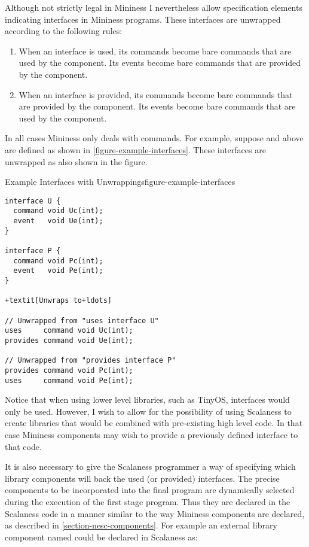 Although not strictly legal in Mininess I nevertheless allow specification elements indicating
interfaces in Mininess programs. These interfaces are unwrapped according to the following
rules:
\begin{enumerate}
\item When an interface is used, its commands become bare commands that are used by the
  component. Its events become bare commands that are provided by the component.
\item When an interface is provided, its commands become bare commands that are provided by the
  component. Its events become bare commands that are used by the component.
\end{enumerate}

In all cases Mininess only deals with commands. For example, suppose  and
 above are defined as shown in \autoref{figure-example-interfaces}. These
interfaces are unwrapped as also shown in the figure.

\singlespace
\begin{fpfig}[tbhp]{Example Interfaces with Unwrappings}{figure-example-interfaces}
{
\begin{Verbatim}[commandchars=+\[\], fontsize=\small]
interface U {
  command void Uc(int);
  event   void Ue(int);
}

interface P {
  command void Pc(int);
  event   void Pe(int);
}

+textit[Unwraps to+ldots]

// Unwrapped from "uses interface U"
uses     command void Uc(int);
provides command void Ue(int);

// Unwrapped from "provides interface P"
provides command void Pc(int);
uses     command void Pe(int);
\end{Verbatim}
}
\end{fpfig}
\primaryspacing

Notice that when using lower level libraries, such as TinyOS, interfaces would only be used.
However, I wish to allow for the possibility of using Scalaness to create libraries that would
be combined with pre-existing high level code. In that case Mininess components may wish to
provide a previously defined interface to that code.

It is also necessary to give the Scalaness programmer a way of specifying which library
components will back the used (or provided) interfaces. The precise components to be
incorporated into the final program are dynamically selected during the execution of the first
stage program. Thus they are declared in the Scalaness code in a manner similar to the way
Mininess components are declared, as described in \autoref{section-nesc-components}. For example
an external library component named  could be declared in Scalaness as:

